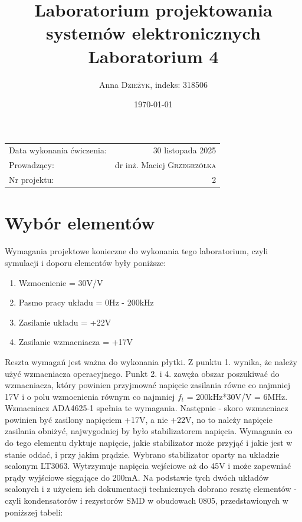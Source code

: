 \documentclass{article}
\title{ Laboratorium projektowania systemów elektronicznych\\ Laboratorium 4 \\} %
\author{Anna \textsc{Dzieżyk}, indeks: 318506 }%
\date{\today} %
\begin{document}
\maketitle %

\begin{center}
	\begin{tabular}{l r}
		Data wykonania ćwiczenia: & 30 listopada 2025 \\ %
		Prowadzący: & dr inż. Maciej \textsc{Grzegrzółka} \\%
        Nr projektu: & 2
	\end{tabular}
\end{center}

\section{Wybór elementów}
Wymagania projektowe konieczne do wykonania tego laboratorium, czyli symulacji i doporu elementów były poniższe:
\begin{enumerate}
    \item Wzmocnienie = 30V/V
    \item Pasmo pracy układu = 0Hz - 200kHz
    \item Zasilanie układu = +22V
    \item Zasilanie wzmacniacza = +17V 
\end{enumerate}
Reszta wymagań jest ważna do wykonania płytki. Z punktu 1. wynika, że należy użyć wzmacniacza operacyjnego. Punkt 2. i 4. zawęża obszar poszukiwać do 
wzmacniacza, który powinien przyjmować napięcie zasilania równe co najmniej 17V i o polu wzmocnienia równym co najmniej $f_t$ = 200kHz*30V/V = 6MHz. Wzmacniacz ADA4625-1 spełnia te wymagania. 
Następnie - skoro wzmacniacz powinien być zasilony napięciem +17V, a nie +22V, no to należy napięcie zasilania obniżyć, najwygodniej by było stabilizatorem napięcia. Wymagania co do tego elementu 
dyktuje napięcie, jakie stabilizator może przyjąć i jakie jest w stanie oddać, i przy jakim prądzie. Wybrano stabilizator oparty na układzie scalonym LT3063. Wytrzymuje napięcia wejściowe aż do 45V i może zapewniać prądy wyjściowe sięgające do 200mA. 
Na podstawie tych dwóch układów scalonych i z użyciem ich dokumentacji technicznych dobrano resztę elementów - czyli kondensatorów i rezystorów SMD w obudowach 0805, przedstawionych w poniższej tabeli:
\end{document}

